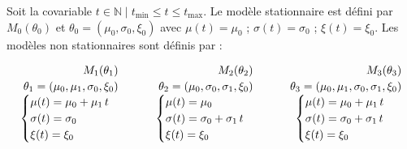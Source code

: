 \documentclass[
  article,
  nofooter,
  noheadings]{jss}
\begin{document}
\begin{tcolorbox}[enhanced jigsaw, leftrule=.75mm, opacityback=0, breakable, toprule=.15mm, colframe=quarto-callout-color-frame, arc=.35mm, colback=white, rightrule=.15mm, bottomrule=.15mm, left=2mm]

Soit la covariable
\(t \in \mathbb{N} \mid t_{\min} \leq t \leq t_{\max}\). Le modèle
stationnaire est défini par \(M_0(\theta_0)\) et
\(\theta_0 = (\mu_0, \sigma_0, \xi_0)\) avec \(\mu(t) = \mu_0\) ;
\(\sigma(t) = \sigma_0\) ; \(\xi(t) = \xi_0\). Les modèles non
stationnaires sont définis par :

\[
\begin{array}{c@{\qquad}c@{\qquad}c}
\begin{array}{c}
\begin{aligned}
M_1(\theta_1)\\[-0.2ex]
\theta_1 = (\mu_0, \mu_1, \sigma_0, \xi_0)
\end{aligned}\\[0.4ex]
\begin{cases}
\mu(t) = \mu_0 + \mu_1\, t \\
\sigma(t) = \sigma_0 \\
\xi(t) = \xi_0
\end{cases}
\end{array}
&
\begin{array}{c}
\begin{aligned}
M_2(\theta_2)\\[-0.2ex]
\theta_2 = (\mu_0, \sigma_0, \sigma_1, \xi_0)
\end{aligned}\\[0.4ex]
\begin{cases}
\mu(t) = \mu_0 \\
\sigma(t) = \sigma_0 + \sigma_1\, t \\
\xi(t) = \xi_0
\end{cases}
\end{array}
&
\begin{array}{c}
\begin{aligned}
M_3(\theta_3)\\[-0.2ex]
\theta_3 = (\mu_0, \mu_1, \sigma_0, \sigma_1, \xi_0)
\end{aligned}\\[0.4ex]
\begin{cases}
\mu(t) = \mu_0 + \mu_1\, t \\
\sigma(t) = \sigma_0 + \sigma_1\, t \\
\xi(t) = \xi_0
\end{cases}
\end{array}
\end{array}
\]

\end{tcolorbox}
\end{document}

